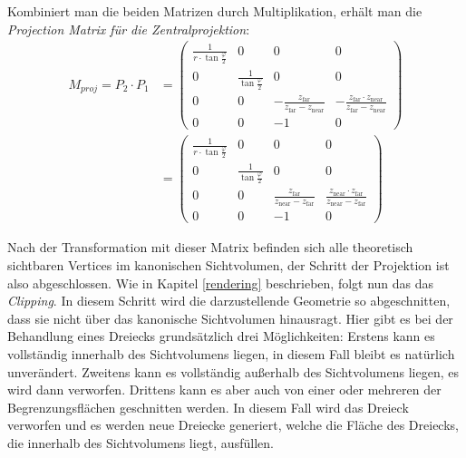 Kombiniert man die beiden Matrizen durch Multiplikation, erhält man die \emph{Projection Matrix für die Zentralprojektion}:
\begin{equation}
\begin{split}
 M_{proj} = P_2 \cdot P_1 &= 
 \begin{pmatrix}
  \frac{1}{r \cdot \tan\frac{\varphi}{2}} & 0 & 0 & 0 \\
  0 & \frac{1}{\tan\frac{\varphi}{2}} & 0 & 0 \\
  0 & 0 & -\frac{z_\mathrm{far}}{z_\mathrm{far}-z_\mathrm{near}} & -\frac{z_\mathrm{far} \cdot z_\mathrm{near}}{z_\mathrm{far}-z_\mathrm{near}} \\
  0 & 0 & -1 & 0
 \end{pmatrix} \\
 &= 
 \begin{pmatrix}
  \frac{1}{r \cdot \tan\frac{\varphi}{2}} & 0 & 0 & 0 \\
  0 & \frac{1}{\tan\frac{\varphi}{2}} & 0 & 0 \\
  0 & 0 & \frac{z_\mathrm{far}}{z_\mathrm{near}-z_\mathrm{far}} & \frac{z_\mathrm{near} \cdot z_\mathrm{far}}{z_\mathrm{near}-z_\mathrm{far}} \\
  0 & 0 & -1 & 0
 \end{pmatrix}
\end{split}
\end{equation}


Nach der Transformation mit dieser Matrix befinden sich alle theoretisch sichtbaren Vertices im kanonischen Sichtvolumen, der Schritt der Projektion ist also abgeschlossen. Wie in Kapitel \ref{rendering} beschrieben, folgt nun das das \emph{Clipping}. In diesem Schritt wird die darzustellende Geometrie so abgeschnitten, dass sie nicht über das kanonische Sichtvolumen hinausragt. Hier gibt es bei der Behandlung eines Dreiecks grundsätzlich drei Möglichkeiten: Erstens kann es vollständig innerhalb des Sichtvolumens liegen, in diesem Fall bleibt es natürlich unverändert. Zweitens kann es vollständig außerhalb des Sichtvolumens liegen, es wird dann verworfen. Drittens kann es aber auch von einer oder mehreren der Begrenzungsflächen geschnitten werden. In diesem Fall wird das Dreieck verworfen und es werden neue Dreiecke generiert, welche die Fläche des Dreiecks, die innerhalb des Sichtvolumens liegt, ausfüllen.

